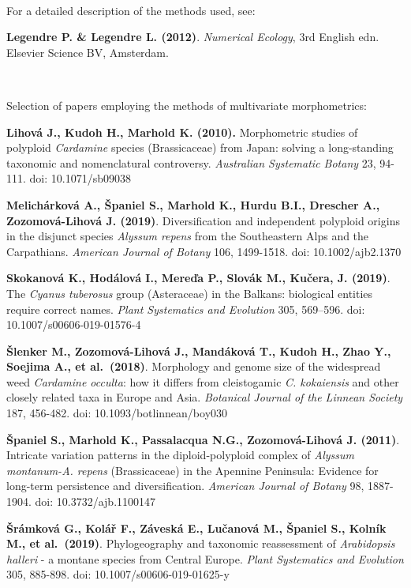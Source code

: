 \documentclass[
  11pt,
  a4paper]{article}
\begin{document}
~\\
\hspace*{0.333em}

For a detailed description of the methods used, see:

\textbf{Legendre P. \& Legendre L. (2012)}. \emph{Numerical Ecology},
3rd English edn. Elsevier Science BV, Amsterdam.

~\\
\hspace*{0.333em}

Selection of papers employing the methods of multivariate morphometrics:

\textbf{Lihová J., Kudoh H., Marhold K. (2010).} Morphometric studies of
polyploid \emph{Cardamine} species (Brassicaceae) from Japan: solving a
long-standing taxonomic and nomenclatural controversy. \emph{Australian
Systematic Botany} 23, 94-111. doi: 10.1071/sb09038

\textbf{Melichárková A., Španiel S., Marhold K., Hurdu B.I., Drescher
A., Zozomová-Lihová J. (2019)}. Diversification and independent
polyploid origins in the disjunct species \emph{Alyssum repens} from the
Southeastern Alps and the Carpathians. \emph{American Journal of Botany}
106, 1499-1518. doi: 10.1002/ajb2.1370

\textbf{Skokanová K., Hodálová I., Mereďa P., Slovák M., Kučera, J.
(2019)}. The \emph{Cyanus tuberosus} group (Asteraceae) in the Balkans:
biological entities require correct names. \emph{Plant Systematics and
Evolution} 305, 569--596. doi: 10.1007/s00606-019-01576-4

\textbf{Šlenker M., Zozomová-Lihová J., Mandáková T., Kudoh H., Zhao Y.,
Soejima A., et al.~(2018)}. Morphology and genome size of the widespread
weed \emph{Cardamine occulta}: how it differs from cleistogamic \emph{C.
kokaiensis} and other closely related taxa in Europe and Asia.
\emph{Botanical Journal of the Linnean Society} 187, 456-482. doi:
10.1093/botlinnean/boy030

\textbf{Španiel S., Marhold K., Passalacqua N.G., Zozomová-Lihová J.
(2011)}. Intricate variation patterns in the diploid-polyploid complex
of \emph{Alyssum montanum-A. repens} (Brassicaceae) in the Apennine
Peninsula: Evidence for long-term persistence and diversification.
\emph{American Journal of Botany} 98, 1887-1904. doi:
10.3732/ajb.1100147

\textbf{Šrámková G., Kolář F., Záveská E., Lučanová M., Španiel S.,
Kolník M., et al.~(2019)}. Phylogeography and taxonomic reassessment of
\emph{Arabidopsis halleri} - a montane species from Central Europe.
\emph{Plant Systematics and Evolution} 305, 885-898. doi:
10.1007/s00606-019-01625-y
\end{document}
